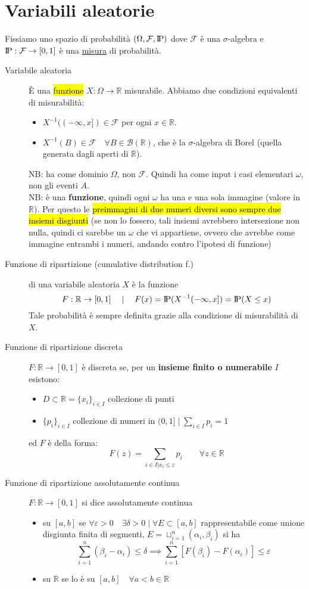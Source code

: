 \documentclass[a4paper,10pt]{article}
\newcommand{\re}{\mathbb{R}} %
\newcommand{\pr}{\text{I\kern-0.15em P}} %
\newcommand{\om}{\Omega} %
\newcommand{\F}{\mathcal{F}} %
\theoremstyle{remark}
\theoremstyle{definition}
\begin{document}
\part{Variabili aleatorie}
Fissiamo uno spazio di probabilità $(\Omega, \mathcal{F}, \pr)$ dove $\mathcal{F}$ è una $\sigma$-algebra e $\pr:\mathcal{F}\to[0,1]$ è una \underline{misura} di probabilità.
\begin{description}
    \item[Variabile aleatoria] È una \hl{funzione} $X: \om \to \mathbb{R}$ misurabile. Abbiamo due condizioni equivalenti di misurabilità:
    \begin{itemize}
        \item $X^{-1}((-\infty,x]) \in \mathcal{F}$ per ogni $x\in\mathbb{R}$.
        \item $X^{-1}(B)\in \mathcal{F} \quad \forall B\in\mathcal{B}(\re)$, che è la $\sigma$-algebra di Borel (quella generata dagli aperti di $\re$).
    \end{itemize}
    NB: ha come dominio $\Omega$, non $\F$. Quindi ha come input i casi elementari $\omega$, non gli eventi $A$. \\
    NB: è una \textbf{funzione}, quindi ogni $\omega$ ha una e una sola immagine (valore in $\re$). Per questo le \hl{preimmagini di due numeri diversi sono sempre due insiemi disgiunti} (se non lo fossero, tali insiemi avrebbero intersezione non nulla, quindi ci sarebbe un $\omega$ che vi appartiene, ovvero che avrebbe come immagine entrambi i numeri, andando contro l'ipotesi di funzione)
\item[Funzione di ripartizione (cumulative distribution f.)] di una variabile aleatoria $X$ è la funzione \[F:\mathbb{R}\to[0,1] \quad \mid \quad  F(x)=\pr(X^{-1}(-\infty, x])=\pr(X\le x)\]
Tale probabilità è sempre definita grazie alla condizione di misurabilità di $X$.


\item[Funzione di ripartizione discreta] $F:\re\to[0,1]$ è discreta se, per un \textbf{insieme finito o numerabile} $I$ esistono:
\begin{itemize}
    \item $D\subset\re=\{x_i\}_{i\in I}$ collezione di punti 
    \item $\{p_i\}_{i\in I}$ collezione di numeri in $(0,1] \mid \sum_{i\in I}p_i=1$
\end{itemize}
ed $F$ è della forma:
$$F(z)=\sum_{i\in I|x_i\le z}p_i \quad \quad \forall z\in\re$$

\item[Funzione di ripartizione assolutamente continua] $F:\re\to[0,1]$ si dice assolutamente continua
\begin{itemize}
    \item su $[a,b]$ se $\forall \varepsilon>0 \quad \exists\delta>0 \mid \forall E\subset[a,b]$ rappresentabile come unione disgiunta finita di segmenti, $E=\sqcup_{i=1}^n(\alpha_i, \beta_i)$ si ha 
    $$\sum_{i=1}^n(\beta_i -\alpha_i)\le \delta \implies \sum_{i=1}^n[F(\beta_i)-F(\alpha_i)] \le \varepsilon$$
    \item su $\re$ se lo è su  $[a,b] \quad\forall a<b \in \re$
\end{itemize}


\end{description}
\end{document}
